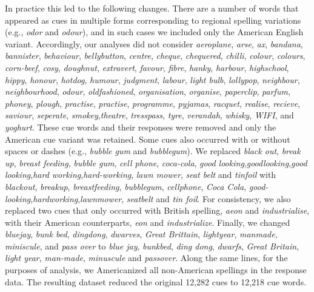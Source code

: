 \documentclass[a4paper,doc,natbib,floatsintext]{apa6}
\newcommand{\stim}[1]{\textsl{#1}}
\begin{document}
In practice this led to the following changes. There are a number of words that appeared as cues in multiple forms corresponding to regional spelling variations (e.g., \stim{odor} and \stim{odour}), and in such cases we included only the American English variant. Accordingly, our analyses did not consider \stim{aeroplane}, \stim{arse}, \stim{ax}, \stim{bandana}, \stim{bannister}, \stim{behaviour}, \stim{bellybutton}, \stim{centre}, \stim{cheque}, \stim{chequered}, \stim{chilli}, \stim{colour}, \stim{colours}, \stim{corn-beef}, \stim{cosy}, \stim{doughnut}, \stim{extravert}, \stim{favour}, \stim{fibre}, \stim{hanky}, \stim{harbour}, \stim{highschool}, \stim{hippy}, \stim{honour}, \stim{hotdog}, \stim{humour}, \stim{judgment}, \stim{labour}, \stim{light bulb}, \stim{lollypop}, \stim{neighbour}, \stim{neighbourhood}, \stim{odour}, \stim{oldfashioned}, \stim{organisation}, \stim{organise}, \stim{paperclip}, \stim{parfum}, \stim{phoney}, \stim{plough}, \stim{practise}, \stim{practise}, \stim{programme}, \stim{pyjamas}, \stim{racquet}, \stim{realise}, \stim{recieve}, \stim{saviour}, \stim{seperate}, \stim{smokey},\stim{theatre}, \stim{tresspass}, \stim{tyre}, \stim{verandah}, \stim{whisky}, \stim{WIFI}, and \stim{yoghurt}. These cue words and their responses were removed and only the American cue variant was retained.
Some cues also occurred with or without spaces or dashes (e.g., \stim{bubble gum} and \stim{bubblegum}). We replaced \stim{black out}, \stim{break up}, \stim{breast feeding}, \stim{bubble gum}, \stim{cell phone}, \stim{coca-cola}, \stim{good looking},\stim{goodlooking},\stim{good looking},\stim{hard working},\stim{hard-working}, \stim{lawn mower}, \stim{seat belt} and \stim{tinfoil} with \stim{blackout}, \stim{breakup}, \stim{breastfeeding}, \stim{bubblegum}, \stim{cellphone}, \stim{Coca Cola}, \stim{good-looking},\stim{hardworking},\stim{lawnmower}, \stim{seatbelt} and \stim{tin foil}.
For consistency, we also replaced two cues that only occurred with British spelling, \stim{aeon} and \stim{industrialise}, with their American counterparts, \stim{eon} and \stim{industrialize}. Finally, we changed  \stim{bluejay}, \stim{bunk bed}, \stim{dingdong}, \stim{dwarves}, \stim{Great Brittain}, \stim{lightyear}, \stim{manmade}, \stim{miniscule}, and \stim{pass over} to \stim{blue jay}, \stim{bunkbed}, \stim{ding dong}, \stim{dwarfs}, \stim{Great Britain}, \stim{light year}, \stim{man-made}, \stim{minuscule} and \stim{passover}. Along the same lines, for the purposes of analysis, we Americanized all non-American spellings in the response data. The resulting dataset reduced the original 12,282 cues to 12,218 cue words.
\end{document}
